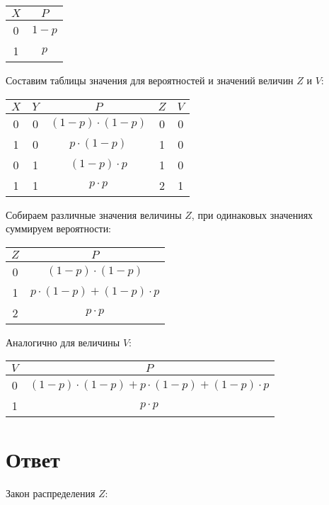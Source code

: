 \begin{tabular}{|c|c|}
    \hline
    $X$ & $P$   \\
    \hline
    0   & $1-p$ \\
    \hline
    1   & $p$   \\
    \hline
\end{tabular}

Составим таблицы значения для вероятностей и значений величин $Z$ и $V$:

\begin{tabular}{|c|c|c|c|c|}
    \hline
    $X$ & $Y$ & $P$                 & $Z$ & $V$ \\
    \hline
    0   & 0   & $(1-p) \cdot (1-p)$ & 0   & 0   \\
    \hline
    1   & 0   & $p \cdot (1-p)$     & 1   & 0   \\
    \hline
    0   & 1   & $(1-p) \cdot p$     & 1   & 0   \\
    \hline
    1   & 1   & $p \cdot p$         & 2   & 1   \\
    \hline
\end{tabular}

Собираем различные значения величины $Z$, при одинаковых значениях суммируем вероятности:

\begin{tabular}{|c|c|}
    \hline
    $Z$ & $P$                             \\
    \hline
    0   & $(1-p) \cdot (1-p)$             \\
    \hline
    1   & $p \cdot (1-p) + (1-p) \cdot p$ \\
    \hline
    2   & $p \cdot p$                     \\
    \hline
\end{tabular}

Аналогично для величины $V$:

\begin{tabular}{|c|c|}
    \hline
    $V$ & $P$                                                 \\
    \hline
    0   & $(1-p) \cdot (1-p) + p \cdot (1-p) + (1-p) \cdot p$ \\
    \hline
    1   & $p \cdot p$                                         \\
    \hline
\end{tabular}

\section*{Ответ}
Закон распределения $Z$:

